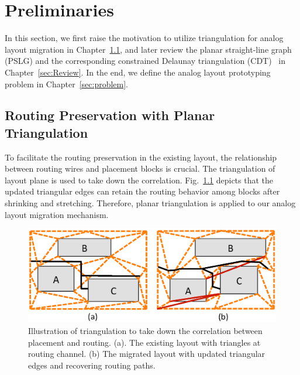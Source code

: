 
\chapter{Preliminaries}\label{chap:prelim}

  \newtheorem{defi}{Definition}

  In this section, we first raise the motivation to utilize triangulation for analog layout migration in Chapter~\ref{sec:WhyCDT}, and later review the planar straight-line graph (PSLG) and the corresponding constrained Delaunay triangulation (CDT)~\cite{CDT} in Chapter~\ref{sec:Review}. In the end, we define the analog layout prototyping problem in Chapter~\ref{sec:problem}.

  \section{Routing Preservation with Planar Triangulation}\label{sec:WhyCDT}

    To facilitate the routing preservation in the existing layout, the relationship between routing wires and placement blocks is crucial. The triangulation of layout plane is used to take down the correlation. Fig.~\ref{fig:WhyCDT} depicts that the updated triangular edges can retain the routing behavior among blocks after shrinking and stretching. Therefore, planar triangulation is applied to our analog layout migration mechanism.

    \begin{figure}[ht]
      \begin{center}
        \includegraphics[width=\textwidth]{Fig/WhyCDT.eps}
        \caption{Illustration of triangulation to take down the correlation between placement and routing. (a). The existing layout with triangles at routing channel. (b) The migrated layout with updated triangular edges and recovering routing paths.}
        \label{fig:WhyCDT}
      \end{center}
    \end{figure}

